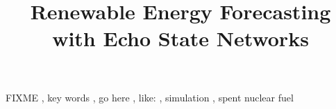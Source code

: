 \documentclass[3p, twocolumn]{elsarticle}
\begin{document}
\begin{frontmatter}
\title{Renewable Energy Forecasting with Echo State Networks}






\begin{keyword}
FIXME \sep
key words \sep
go here \sep
like: \sep
simulation \sep
spent nuclear fuel
\end{keyword}


\end{frontmatter}
\glsresetall

\linenumbers










%
\end{document}
